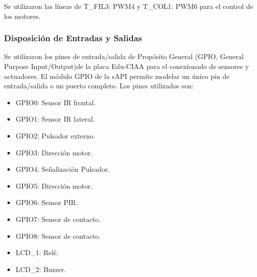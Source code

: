 Se utilizaron las líneas de T\_FIL3: PWM4 y T\_COL1: PWM6 para el control de los motores.



		\subsubsection{Disposición de Entradas y Salidas}

Se utilizaron los pines de entrada/salida de Propósito General (GPIO, General Purpose Input/Output)de la placa Edu-CIAA para el conexionado de sensores y actuadores. El módulo GPIO de la sAPI permite modelar un único pin de entrada/salida o un puerto completo.
Los pines utilizados son:

\begin{itemize}
	\item GPIO0:  	Sensor IR frontal.
	\item GPIO1:  	Sensor IR lateral.
	\item GPIO2:  	Pulsador externo.
	\item GPIO3:  	Dirección motor.	
	\item GPIO4:  	Señalización Pulsador.
	\item GPIO5:  	Dirección motor.		
	\item GPIO6:  	Sensor PIR. 
	\item GPIO7:  	Sensor de contacto. 
	\item GPIO8:  	Sensor de contacto. 
	\item LCD\_1:  	Relé.
	\item LCD\_2:  	Buzzer.		
\end{itemize}









